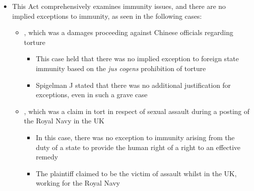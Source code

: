\begin{itemize}
    \item This Act comprehensively examines immunity issues, and there are no implied exceptions to immunity, as seen in the following cases:
    \begin{itemize}
        \item {}, which was a damages proceeding against Chinese officials regarding torture
        \begin{itemize}
            \item This case held that there was no implied exception to foreign state immunity based on the \textit{jus cogens} prohibition of torture
            \item Spigelman J stated that there was no additional justification for exceptions, even in such a grave case
        \end{itemize}
        \item {}, which was a claim in tort in respect of sexual assault during a posting of the Royal Navy in the UK
        \begin{itemize}
            \item In this case, there was no exception to immunity arising from the duty of a state to provide the human right of a right to an effective remedy
            \item The plaintiff claimed to be the victim of assault whilst in the UK, working for the Royal Navy
        \end{itemize}
    \end{itemize}
\end{itemize}

